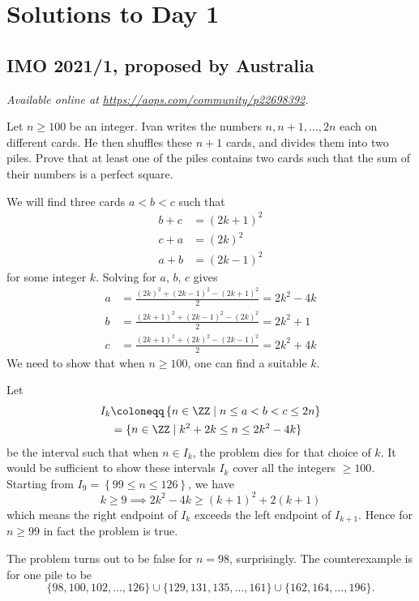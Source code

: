 \documentclass[11pt]{scrartcl}
\begin{document}
\section{Solutions to Day 1}
\subsection{IMO 2021/1, proposed by Australia}
\textsl{Available online at \url{https://aops.com/community/p22698392}.}
\begin{mdframed}[style=mdpurplebox,frametitle={Problem statement}]
Let $n \ge 100$ be an integer.
Ivan writes the numbers $n, n+1, \dots, 2n$ each on different cards.
He then shuffles these $n+1$ cards, and divides them into two piles.
Prove that at least one of the piles contains two cards such that
the sum of their numbers is a perfect square.
\end{mdframed}
We will find three cards $a < b < c$ such that
\begin{align*}
  b+c &= (2k+1)^2 \\
  c+a &= (2k)^2 \\
  a+b &= (2k-1)^2
\end{align*}
for some integer $k$.
Solving for $a$, $b$, $c$ gives
\begin{align*}
  a &= \frac{(2k)^2+(2k-1)^2-(2k+1)^2}{2} = 2k^2 - 4k \\
  b &= \frac{(2k+1)^2+(2k-1)^2-(2k)^2}{2} = 2k^2 + 1 \\
  c &= \frac{(2k+1)^2+(2k)^2-(2k-1)^2}{2} = 2k^2 + 4k
\end{align*}
We need to show that when $n \ge 100$, one can find a suitable $k$.

Let
\begin{align*}
  I_k &\coloneqq \left\{ n \in \ZZ \mid n \le a < b < c \le 2n \right\} \\
  &= \{ n \in \ZZ \mid k^2+2k \le n \le  2k^2-4k \}
\end{align*}
be the interval such that when $n \in I_k$,
the problem dies for that choice of $k$.
It would be sufficient to show these intervals $I_k$
cover all the integers $\ge 100$.
Starting from $I_9 = \left\{ 99 \le n \le 126 \right\}$,
we have
\[ k \ge 9 \implies 2k^2 - 4k \ge (k+1)^2 + 2(k+1) \]
which means the right endpoint of $I_k$
exceeds the left endpoint of $I_{k+1}$.
Hence for $n \ge 99$ in fact the problem is true.

\begin{remark*}
  The problem turns out to be false for $n = 98$, surprisingly.
  The counterexample is for one pile to be
  \[ \{98,100,102,\dots,126\}
    \cup \{129,131,135,\dots,161 \}
    \cup \{162, 164, \dots, 196\}. \]
\end{remark*}
\pagebreak
\end{document}
